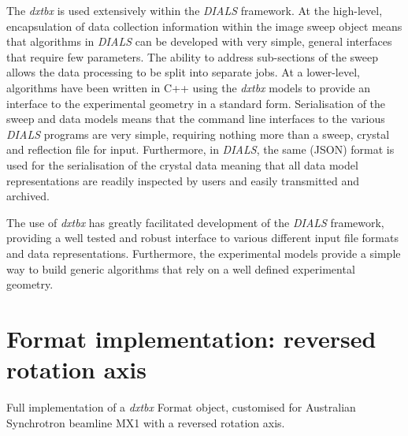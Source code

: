 \documentclass[preprint]{iucr}
\newcommand{\dxtbx}{\emph{dxtbx}\xspace}
\newcommand{\dials}{\emph{DIALS}\xspace}
\begin{document}
The \dxtbx is used extensively within the \dials framework. At the high-level, 
encapsulation of data collection information within the image sweep object means 
that algorithms in \dials can be developed with very simple, general interfaces 
that require few parameters. The ability to address sub-sections of the sweep 
allows the data processing to be split into separate jobs. At a lower-level, 
algorithms have been written in C++ using the \dxtbx models to provide an interface 
to the experimental geometry in a standard form. Serialisation of the sweep and 
data models means that the command line interfaces to the various \dials programs 
are very simple, requiring nothing more than a sweep, crystal and reflection file 
for input. Furthermore, in \dials, the same (JSON) format is used for the 
serialisation of the crystal data meaning that all data model representations 
are readily inspected by users and easily transmitted and archived.

The use of \dxtbx has greatly facilitated development of the \dials framework, 
providing a well tested and robust interface to various different input file 
formats and data representations. Furthermore, the experimental models provide 
a simple way to build generic algorithms that rely on a well defined 
experimental geometry.

\appendix
\section{Format implementation: reversed rotation axis}

Full implementation of a \dxtbx Format object, customised for Australian 
Synchrotron beamline MX1 with a reversed rotation axis.
\end{document}
